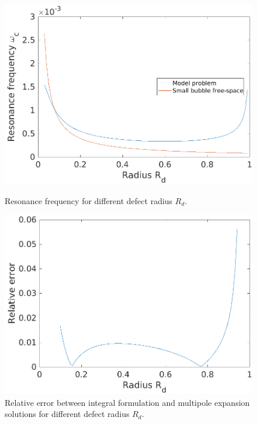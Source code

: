 \documentclass[a4paper]{article}
\theoremstyle{definition}
\begin{document}
\begin{figure}[H]
	\centering
	\begin{minipage}[t]{0.45\linewidth}
	\includegraphics[scale=0.5]{../Model_problem/simpleSol.png}
	\caption{Resonance frequency for different defect radius $R_d$.}
	\label{fig:simpleSol}
	\end{minipage}
	\hspace{10pt}
	\begin{minipage}[t]{0.45\linewidth}
	\includegraphics[scale=0.5]{../Model_problem/simpleErr.png}
	\caption{Relative error between integral formulation and multipole expansion solutions for different defect radius $R_d$.}
	\label{fig:simpleErr}
\end{minipage}
\end{figure}
\end{document}
